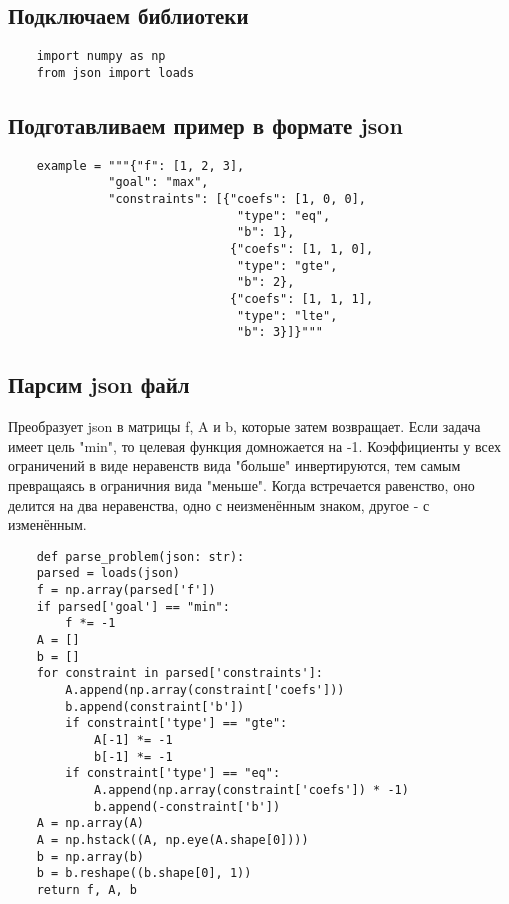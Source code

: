\documentclass{article}
\begin{document}
\subsection{Подключаем библиотеки}

\begin{listing}[H]
    \begin{verbatim}
    import numpy as np
    from json import loads
    \end{verbatim}
\end{listing}

\subsection{Подготавливаем пример в формате json}
\begin{listing}[H]
    \begin{verbatim}
    example = """{"f": [1, 2, 3],
              "goal": "max",
              "constraints": [{"coefs": [1, 0, 0],
                                "type": "eq",
                                "b": 1},
                               {"coefs": [1, 1, 0],
                                "type": "gte",
                                "b": 2},
                               {"coefs": [1, 1, 1],
                                "type": "lte",
                                "b": 3}]}"""
    \end{verbatim}
\end{listing}

\subsection{Парсим json файл}

Преобразует json в матрицы f, A и b, которые затем возвращает. Если задача имеет цель "min", то целевая функция домножается на -1.
Коэффициенты у всех ограничений в виде неравенств вида "больше" инвертируются, тем самым превращаясь в ограничния вида "меньше".
Когда встречается равенство, оно делится на два неравенства, одно с неизменённым знаком, другое - с изменённым.

\begin{listing}[H]
    \begin{verbatim}
    def parse_problem(json: str):
    parsed = loads(json)
    f = np.array(parsed['f'])
    if parsed['goal'] == "min":
        f *= -1
    A = []
    b = []
    for constraint in parsed['constraints']:
        A.append(np.array(constraint['coefs']))
        b.append(constraint['b'])
        if constraint['type'] == "gte":
            A[-1] *= -1
            b[-1] *= -1
        if constraint['type'] == "eq":
            A.append(np.array(constraint['coefs']) * -1)
            b.append(-constraint['b'])
    A = np.array(A)
    A = np.hstack((A, np.eye(A.shape[0])))
    b = np.array(b)
    b = b.reshape((b.shape[0], 1))
    return f, A, b
    \end{verbatim}
\end{listing}
\end{document}
